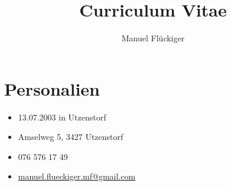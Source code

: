 \documentclass{article}
\renewcommand{\maketitle}{
    \begin{center}
    {\huge\bfseries
    \theauthor}
    \end{center}
}
\begin{document}
\selectfont


\title{Curriculum Vitae}
\author{Manuel Fl\"uckiger}

\maketitle
\section{Personalien}
\begin{itemize}[parsep = 0.05cm]
    \item[] 13.07.2003 in Utzenstorf
    \item[] Amselweg 5, 3427 Utzenstorf
    \item[] 076 576 17 49
    \item[]\href{mailto:manuel.flueckiger.mf@gmail.com}{manuel.flueckiger.mf@gmail.com}
\end{itemize}
\end{document}

